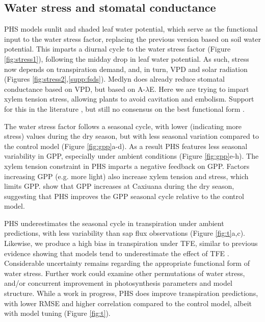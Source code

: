 \documentclass[draft,linenumbers]{agujournal}
\begin{document}
\subsection{Water stress and stomatal conductance}

    PHS models sunlit and shaded leaf water potential, which serve as the functional input to the water stress factor, 
    replacing the previous version based on soil water potential.
    This imparts a diurnal cycle to the water stress factor (Figure \ref{fig:stress1}), following the midday drop in leaf water potential.
    As such, stress now depends on transpiration demand, and, in turn, VPD and solar radiation (Figures \ref{fig:stress2},\ref{supp:fsds}).
    Medlyn does already reduce stomatal conductance based on VPD, but based on A-$\lambda$E.
    Here we are trying to impart xylem tension stress, allowing plants to avoid cavitation and embolism.
    Support for this in the literature \citep{novick2016a,sperry2017}, but still no consensus on the best functional form \citep{zhou2013}. 
    
    The water stress factor follows a seasonal cycle, with lower (indicating more stress) values during the dry season, 
    but with less seasonal variation compared to the control model (Figure \ref{fig:gpp}a-d).
    As a result PHS features less seasonal variability in GPP, especially under ambient conditions (Figure \ref{fig:gpp}e-h).
    The xylem tension constraint in PHS imparts a negative feedback on GPP.
    Factors increasing GPP (e.g. more light) also increase xylem tension and stress, which limits GPP.
    \cite{restrepo2017} show that GPP increases at Caxiuana during the dry season, suggesting that PHS improves the GPP seasonal cycle relative to the control model.
    
    PHS underestimates the seasonal cycle in transpiration under ambient predictions, with less variability than sap flux observations (Figure \ref{fig:t}a,c).
    Likewise, we produce a high bias in transpiration under TFE, similar to previous evidence showing that models tend to underestimate the effect of TFE \citep{powell2013}.
    Considerable uncertainty remains regarding the appropriate functional form of water stress.
    Further work could examine other permutations of water stress, and/or concurrent improvement in photosynthesis parameters and model structure.
    While a work in progress, PHS does improve transpiration predictions, 
    with lower RMSE and higher correlation compared to the control model, albeit with model tuning (Figure \ref{fig:t}).
    
\end{document}
